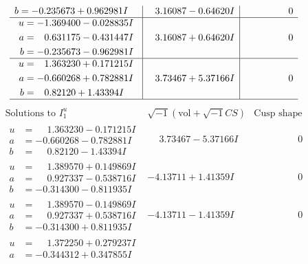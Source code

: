 \documentclass[1p]{elsarticle_modified}
\theoremstyle{definition}
\newcommand{\I}{\sqrt{-1}}
\begin{document}
$$\begin{array}{c|c|c}
\begin{aligned}
b &= -0.235673 + 0.962981 I\end{aligned}
 & \phantom{-}3.16087 - 0.64620 I & \phantom{-0.000000 } 0 \\ \hline\begin{aligned}
u &= -1.369400 - 0.028835 I \\
a &= \phantom{-}0.631175 - 0.431447 I \\
b &= -0.235673 - 0.962981 I\end{aligned}
 & \phantom{-}3.16087 + 0.64620 I & \phantom{-0.000000 } 0 \\ \hline\begin{aligned}
u &= \phantom{-}1.363230 + 0.171215 I \\
a &= -0.660268 + 0.782881 I \\
b &= \phantom{-}0.82120 + 1.43394 I\end{aligned}
 & \phantom{-}3.73467 + 5.37166 I & \phantom{-0.000000 } 0\\
 \hline 
 \end{array}$$\newpage$$\begin{array}{c|c|c}  
\text{Solutions to }I^u_{1}& \I (\text{vol} + \sqrt{-1}CS) & \text{Cusp shape}\\
 \hline 
\begin{aligned}
u &= \phantom{-}1.363230 - 0.171215 I \\
a &= -0.660268 - 0.782881 I \\
b &= \phantom{-}0.82120 - 1.43394 I\end{aligned}
 & \phantom{-}3.73467 - 5.37166 I & \phantom{-0.000000 } 0 \\ \hline\begin{aligned}
u &= \phantom{-}1.389570 + 0.149869 I \\
a &= \phantom{-}0.927337 - 0.538716 I \\
b &= -0.314300 - 0.811935 I\end{aligned}
 & -4.13711 + 1.41359 I & \phantom{-0.000000 } 0 \\ \hline\begin{aligned}
u &= \phantom{-}1.389570 - 0.149869 I \\
a &= \phantom{-}0.927337 + 0.538716 I \\
b &= -0.314300 + 0.811935 I\end{aligned}
 & -4.13711 - 1.41359 I & \phantom{-0.000000 } 0 \\ \hline\begin{aligned}
u &= \phantom{-}1.372250 + 0.279237 I \\
a &= -0.344312 + 0.347855 I \\

\end{aligned}
\end{array}$$
\end{document}

